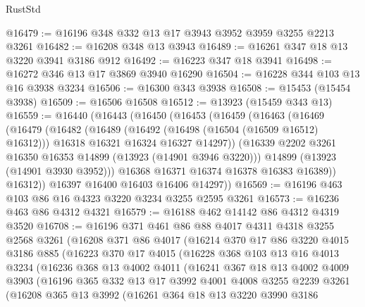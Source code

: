\begin{lexlean}{RustStd}
\begin{coremodule}
@16479 := @16196 @348 @332 @13 @17 @3943 @3952 @3959 @3255 @2213 @3261
@16482 := @16208 @348 @13 @3943
@16489 := @16261 @347 @18 @13 @3220 @3941 @3186 @912
@16492 := @16223 @347 @18 @3941
@16498 := @16272 @346 @13 @17 @3869 @3940 @16290
@16504 := @16228 @344 @103 @13 @16 @3938 @3234
@16506 := @16300 @343 @3938
@16508 := @15453 (@15454 @3938)
@16509 := @16506 @16508
@16512 := @13923 (@15459 @343 @13)
@16559 := @16440
    (@16443
      (@16450
        (@16453
          (@16459
            (@16463
              (@16469
                (@16479
                  (@16482
                    (@16489
                      (@16492 (@16498 (@16504 (@16509 @16512) @16312)))
                      @16318
                      @16321
                      @16324
                      @16327
                      @14297))
                  (@16339 @2202 @3261 @16350 @16353 @14899 (@13923 (@14901 @3946 @3220)))
                  @14899
                  (@13923 (@14901 @3930 @3952)))
                @16368
                @16371
                @16374
                @16378
                @16383
                @16389))
            @16312))
        @16397
        @16400
        @16403
        @16406
        @14297))
@16569 := @16196 @463 @103 @86 @16 @4323 @3220 @3234 @3255 @2595 @3261
@16573 := @16236 @463 @86 @4312 @4321
@16579 := @16188 @462 @14142 @86 @4312 @4319 @3520
@16708 := @16196
    @371
    @461
    @86
    @88
    @4017
    @4311
    @4318
    @3255
    @2568
    @3261
    (@16208
      @371
      @86
      @4017
      (@16214
        @370
        @17
        @86
        @3220
        @4015
        @3186
        @885
        (@16223
          @370
          @17
          @4015
          (@16228
            @368
            @103
            @13
            @16
            @4013
            @3234
            (@16236
              @368
              @13
              @4002
              @4011
              (@16241
                @367
                @18
                @13
                @4002
                @4009
                @3903
                (@16196
                  @365
                  @332
                  @13
                  @17
                  @3992
                  @4001
                  @4008
                  @3255
                  @2239
                  @3261
                  (@16208
                    @365
                    @13
                    @3992
                    (@16261
                      @364
                      @18
                      @13
                      @3220
                      @3990
                      @3186

\end{coremodule}
\end{lexlean}
